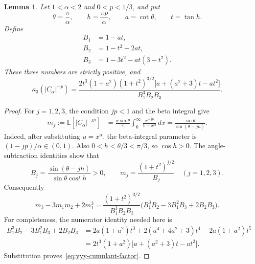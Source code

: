 \documentclass[11pt,a4paper]{article}
\newtheorem{lemma}[theorem]{Lemma}
\theoremstyle{definition}
\theoremstyle{remark}
\newcommand{\E}{\mathbb E}
\numberwithin{equation}{section}
\begin{document}
\begin{lemma}
\label{lem:yyy-factorization}
Let $1<\alpha<2$ and $0<p<1/3$, and put
\[
 \theta=\frac{\pi}{\alpha},\qquad
 h=\frac{\pi p}{\alpha},\qquad
 a=\cot\theta,\qquad t=\tan h.
\]
Define
\begin{align*}
 B_1&=1-at,\\
 B_2&=1-t^2-2at,\\
 B_3&=1-3t^2-at(3-t^2).
\end{align*}
These three numbers are strictly positive, and
\begin{equation}
 \kappa_3(|C_\alpha|^{-p})
 =\frac{2t^3(1+a^2)(1+t^2)^{3/2}
       \bigl[a+(a^2+3)t-at^2\bigr]}
       {B_1^3B_2B_3}.
 \label{eq:yyy-cumulant-factor}
\end{equation}
\end{lemma}

\begin{proof}
For $j=1,2,3$, the condition $jp<1$ and the beta integral give
\begin{align}
 m_j:=\E[|C_\alpha|^{-jp}]
 &=\frac{\alpha\sin\theta}{\pi}
     \int_0^\infty\frac{x^{-jp}}{1+x^\alpha}\,dx
 =\frac{\sin\theta}{\sin(\theta-jh)}.
 \label{eq:yyy-moments}
\end{align}
Indeed, after substituting $u=x^\alpha$, the beta-integral parameter is
$(1-jp)/\alpha\in(0,1)$. Also
$0<h<\theta/3<\pi/3$, so $\cos h>0$. The angle-subtraction identities
show that
\[
 B_j=\frac{\sin(\theta-jh)}{\sin\theta\cos^j h}>0,
 \qquad
 m_j=\frac{(1+t^2)^{j/2}}{B_j}
 \quad(j=1,2,3).
\]
Consequently
\[
 m_3-3m_1m_2+2m_1^3
 =\frac{(1+t^2)^{3/2}}{B_1^3B_2B_3}
       \bigl(B_1^3B_2-3B_1^2B_3+2B_2B_3\bigr).
\]
For completeness, the numerator identity needed here is
\begin{align*}
 B_1^3B_2-3B_1^2B_3+2B_2B_3
 &=2a(1+a^2)t^3
   +2(a^4+4a^2+3)t^4-2a(1+a^2)t^5\\
 &=2t^3(1+a^2)\bigl[a+(a^2+3)t-at^2\bigr].
\end{align*}
Substitution proves~\eqref{eq:yyy-cumulant-factor}.
\end{proof}
\end{document}
